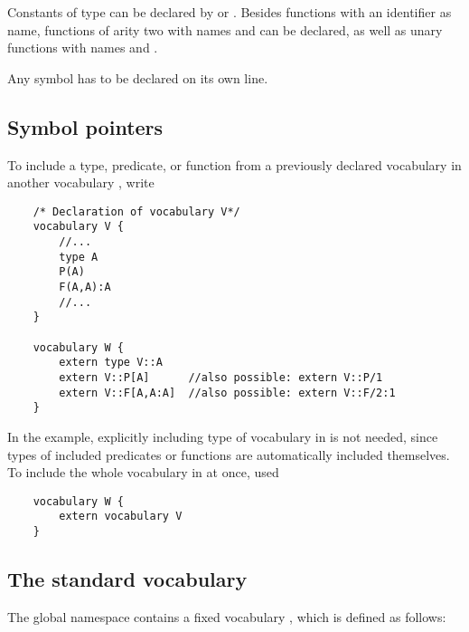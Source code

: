 Constants of type  can be declared by  or .  Besides functions with an identifier as name, functions of arity two with names \code{+,-,*,/,\%}  and \code{\textasciicircum} can be declared, as well as unary functions with names \code{-} and .

Any symbol has to be declared on its own line.



\subsection{Symbol pointers}

To include a type, predicate, or function from a previously declared vocabulary  in another vocabulary , write
\begin{lstlisting}
	/* Declaration of vocabulary V*/
	vocabulary V {
		//...
		type A
		P(A)
		F(A,A):A
		//...
	}

	vocabulary W {
		extern type V::A
		extern V::P[A]		//also possible: extern V::P/1
		extern V::F[A,A:A]	//also possible: extern V::F/2:1
	}
\end{lstlisting}


In the example, explicitly including type  of vocabulary  in  is not needed, since types of included predicates or functions are automatically included themselves.  To include the whole vocabulary  in  at once, used
\begin{lstlisting}
	vocabulary W {
		extern vocabulary V
	}
\end{lstlisting}




\subsection{The standard vocabulary}

The global namespace contains a fixed vocabulary , which is defined as follows:

